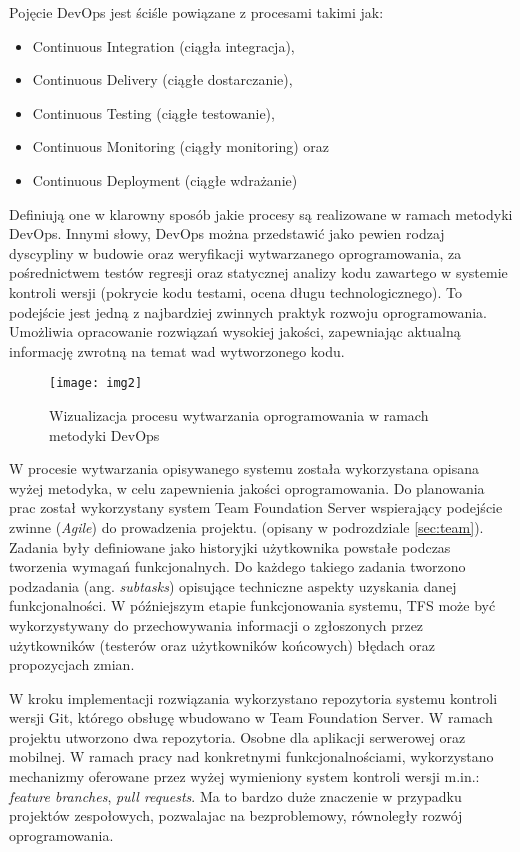 Pojęcie DevOps jest ściśle powiązane z procesami takimi jak:
\begin{itemize}
\item Continuous Integration (ciągła integracja),
\item Continuous Delivery (ciągłe dostarczanie),
\item Continuous Testing (ciągłe testowanie),
\item Continuous Monitoring (ciągły monitoring) oraz
\item Continuous Deployment (ciągłe wdrażanie)
\end{itemize}
\newpage
Definiują one w klarowny sposób jakie procesy są realizowane w ramach metodyki DevOps. Innymi słowy, DevOps można przedstawić jako pewien rodzaj dyscypliny w budowie oraz weryfikacji wytwarzanego oprogramowania, za pośrednictwem testów regresji oraz statycznej analizy kodu zawartego w systemie kontroli wersji (pokrycie kodu testami, ocena długu technologicznego). To podejście jest jedną z najbardziej zwinnych praktyk rozwoju oprogramowania. Umożliwia opracowanie rozwiązań wysokiej jakości, zapewniając aktualną informację zwrotną na temat wad wytworzonego kodu. \cite{Devopsco42:online}

\begin{figure}[h]
\centering
\texttt{[image: img2]}
\caption{Wizualizacja procesu wytwarzania oprogramowania w ramach metodyki DevOps}
\end{figure}

W procesie wytwarzania opisywanego systemu została wykorzystana opisana wyżej metodyka, w celu zapewnienia jakości oprogramowania. Do planowania prac został wykorzystany system Team Foundation Server wspierający podejście zwinne (\textit{Agile}) do prowadzenia projektu. (opisany w podrozdziale \ref{sec:team}). Zadania były definiowane jako historyjki użytkownika powstałe podczas tworzenia wymagań funkcjonalnych. Do każdego takiego zadania tworzono podzadania (ang. \textit{subtasks}) opisujące techniczne aspekty uzyskania danej funkcjonalności. W późniejszym etapie funkcjonowania systemu, TFS może być wykorzystywany do przechowywania informacji o zgłoszonych przez użytkowników (testerów oraz użytkowników końcowych) błędach oraz propozycjach zmian.

W kroku implementacji rozwiązania wykorzystano repozytoria systemu kontroli wersji Git, którego obsługę wbudowano w Team Foundation Server. W ramach projektu utworzono dwa repozytoria. Osobne dla aplikacji serwerowej oraz mobilnej. W ramach pracy nad konkretnymi funkcjonalnościami, wykorzystano mechanizmy oferowane przez wyżej wymieniony system kontroli wersji  m.in.: \textit{feature branches}, \textit{pull requests}. Ma to bardzo duże znaczenie w przypadku projektów zespołowych, pozwalajac na bezproblemowy, równoległy rozwój oprogramowania.

